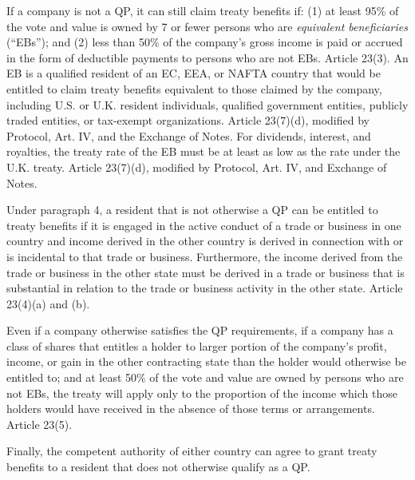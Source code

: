 If a company is not a QP, it can still claim treaty benefits if: (1) at least 95\% of the vote and value is owned by 7 or fewer persons who are \emph{equivalent beneficiaries} (``EBs''); and (2) less than 50\% of the company's gross income is paid or accrued in the form of deductible payments to persons who are not EBs.  Article 23(3).  An EB is a qualified resident of an EC, EEA, or NAFTA country that would be entitled to claim treaty benefits equivalent to those claimed by the company, including U.S. or U.K. resident individuals, qualified government entities, publicly traded entities, or tax-exempt organizations.  Article 23(7)(d), modified by Protocol, Art. IV, and the Exchange of Notes.  For dividends, interest, and royalties, the treaty rate of the EB must be at least as low as the rate under the U.K. treaty.  Article 23(7)(d), modified by Protocol, Art. IV, and Exchange of Notes.
 
Under paragraph 4, a resident that is not otherwise a QP can be entitled to treaty benefits if it is engaged in the active conduct of a trade or business in one country and income derived in the other country is derived in connection with or is incidental to that trade or business.  Furthermore, the income derived from the trade or business in the other state must be derived in a trade or business that is substantial in relation to the trade or business activity in the other state.  Article 23(4)(a) and (b).

Even if a company otherwise satisfies the QP requirements, if a company has a class of shares that entitles a holder to larger portion of the company's profit, income, or gain in the other contracting state than the holder would otherwise be entitled to; and at least 50\% of the vote and value are owned by persons who are not EBs, the treaty will apply only to the proportion of the income which those holders would have received in the absence of those terms or arrangements.  Article 23(5). 

Finally, the competent authority of either country can agree to grant treaty benefits to a resident that does not otherwise qualify as a QP.   



